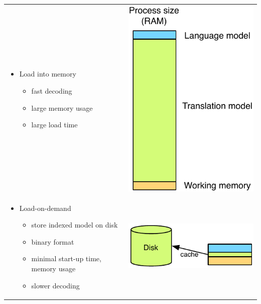 \documentclass[landscape]{uedslides2C}
\begin{document}

\vspace{10mm}
\begin{tabular}{p{13cm}c}
\vspace{-7cm}
\begin{itemize}
\item Load into memory
	\begin{itemize}
  	\item fast decoding
	\item large memory usage
	\item large load time
	\end{itemize}
\end{itemize}
& \includegraphics[scale=0.8]{less-memory-europarl.pdf} \\[1cm]
\vspace{-4.5cm}
\begin{itemize}
\item Load-on-demand
	\begin{itemize}
  	\item store indexed model on disk
	\item binary format
	\item minimal start-up time, memory usage
	\item slower decoding
	\end{itemize}
\end{itemize}
&  \includegraphics[scale=0.8]{less-memory-europarl-on-disk.pdf}
\end{tabular}
\end{document}
